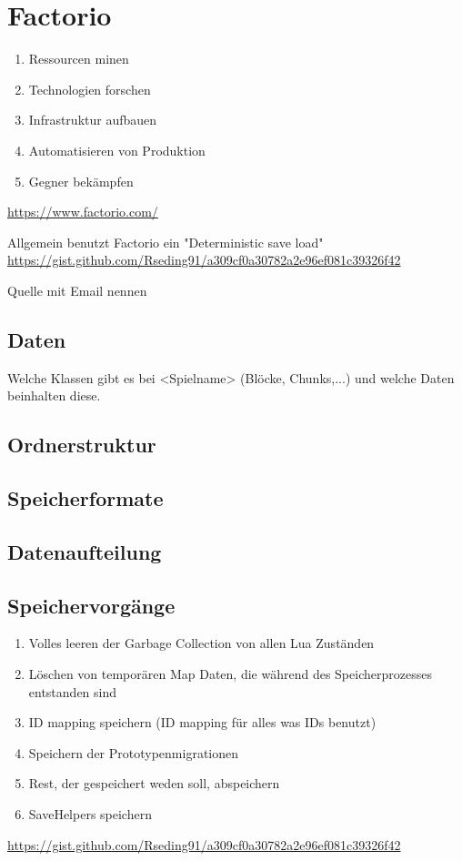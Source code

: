 \section{Factorio}
\begin{enumerate}
    \item Ressourcen minen 
    \item Technologien forschen
    \item Infrastruktur aufbauen
    \item Automatisieren von Produktion
    \item Gegner bekämpfen
\end{enumerate}
\url{https://www.factorio.com/}

Allgemein benutzt Factorio ein "Deterministic save load"
\url{https://gist.github.com/Rseding91/a309cf0a30782a2e96ef081c39326f42}

Quelle mit Email nennen

\subsection{Daten}
Welche Klassen gibt es bei <Spielname> (Blöcke, Chunks,...) und welche Daten 
beinhalten diese.

\subsection{Ordnerstruktur}

\subsection{Speicherformate}

\subsection{Datenaufteilung}

\subsection{Speichervorgänge}
\begin{enumerate}
    \item Volles leeren der Garbage Collection von allen Lua Zuständen
    \item Löschen von temporären Map Daten, die während des Speicherprozesses entstanden sind
    \item ID mapping speichern (ID mapping für alles was IDs benutzt)
    \item Speichern der Prototypenmigrationen
    \item Rest, der gespeichert weden soll, abspeichern
    \item SaveHelpers speichern
\end{enumerate}
\url{https://gist.github.com/Rseding91/a309cf0a30782a2e96ef081c39326f42}


